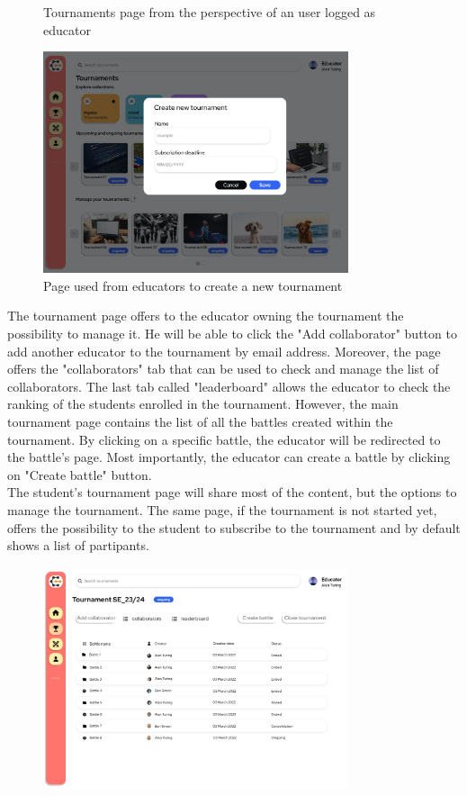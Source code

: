 \begin{enumerate}[label=\textbf{F\arabic*)}]
\begin{figure}[H]
        \caption{Tournaments page from the perspective of an user logged as educator}
    \end{figure}
    \begin{figure}[H]
        \centering
        \includegraphics[width=0.8\textwidth]{Mockups/6_educator_create_tournament.png}
        \caption{Page used from educators to create a new tournament}
    \end{figure}
    The tournament page offers to the educator owning the tournament the possibility to manage it. He will be able to click the "Add collaborator" button to add another educator to the tournament by email address. Moreover, the page offers the "collaborators" tab that can be used to check and manage the list of collaborators. The last tab called "leaderboard" allows the educator to check the ranking of the students enrolled in the tournament. However, the main tournament page contains the list of all the battles created within the tournament.  By clicking on a specific battle, the educator will be redirected to the battle's page. Most importantly, the educator can create a battle by clicking on "Create battle" button.\\
    The student's tournament page will share most of the content, but the options to manage the tournament. The same page, if the tournament is not started yet, offers the possibility to the student to subscribe to the tournament and by default shows a list of partipants. \\
    \begin{figure}[H]
        \centering
        \includegraphics[width=0.8\textwidth]{Mockups/7_educator_manages_tournament.png}

\end{figure}
\end{enumerate}
